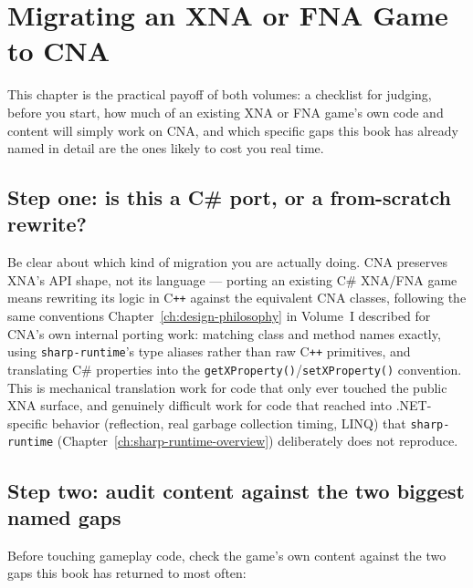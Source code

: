 \chapter{Migrating an XNA or FNA Game to CNA}
\label{ch:migration-guide}

This chapter is the practical payoff of both volumes: a checklist for judging, before you
start, how much of an existing XNA or FNA game's own code and content will simply work on
CNA, and which specific gaps this book has already named in detail are the ones likely to
cost you real time.

\section{Step one: is this a C\# port, or a from-scratch rewrite?}

Be clear about which kind of migration you are actually doing. CNA preserves XNA's API
shape, not its language --- porting an existing C\# XNA/FNA game means rewriting its logic in
C\texttt{++} against the equivalent CNA classes, following the same conventions
Chapter~\ref{ch:design-philosophy} in Volume~I described for CNA's own internal porting work:
matching class and method names exactly, using \texttt{sharp-runtime}'s type aliases rather
than raw C\texttt{++} primitives, and translating C\# properties into the
\texttt{getXProperty()}/\texttt{setXProperty()} convention. This is mechanical translation
work for code that only ever touched the public XNA surface, and genuinely difficult work for
code that reached into .NET-specific behavior (reflection, real garbage collection timing,
LINQ) that \texttt{sharp-runtime} (Chapter~\ref{ch:sharp-runtime-overview}) deliberately does
not reproduce.

\section{Step two: audit content against the two biggest named gaps}

Before touching gameplay code, check the game's own content against the two gaps this book
has returned to most often:


